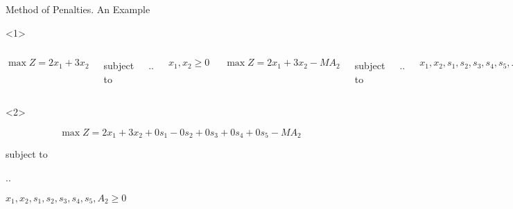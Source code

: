 \begin{frame}{Method of Penalties. An Example}{}

  \begin{onlyenv}<1>
    \begin{columns}

        \[ \max Z = 2x_1 + 3x_2 \]

        {\centering
          subject to

          \sysdelim..%

      \vspace{5mm}
              $x_1, x_2  \geq 0$
        \par}

        \[\max Z = 2x_1 + 3x_2 - MA_2 \]

        {\centering
          subject to

\sysdelim..%

          \vspace{5mm}
      $x_1, x_2, s_1, s_2, s_3, s_4, s_5, A_2  \geq 0$
    \par}

    \end{columns}
  \end{onlyenv}

  \begin{onlyenv}<2>

    \[ \max Z = 2x_1 + 3x_2 +0s_1 - 0s_2 + 0s_3 + 0s_4 + 0s_5 - MA_2 \]

    {\centering
      subject to

      \sysdelim..%

    \vspace{5mm}
    $x_1, x_2, s_1, s_2, s_3, s_4, s_5, A_2  \geq 0$
  \par}
  \end{onlyenv}
\end{frame}

